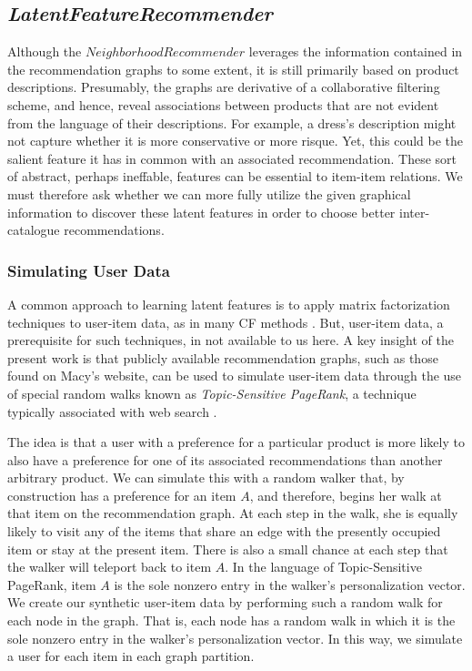 \documentclass[11pt]{article}
\begin{document}
\subsection*{\em LatentFeatureRecommender}
Although the $NeighborhoodRecommender$ leverages the information contained in
the recommendation graphs to some extent, it is still primarily based on product
descriptions. Presumably, the graphs are derivative of a collaborative filtering
scheme, and hence, reveal associations between products that are not evident
from the language of their descriptions. For example, a dress's description
might not capture whether it is more conservative or more risque. Yet, this
could be the salient feature it has in common with an associated recommendation.
These sort of abstract, perhaps ineffable, features can be essential to
item-item relations. We must therefore ask whether we can more fully utilize the
given graphical information to discover these latent features in order to choose
better inter-catalogue recommendations.

\subsubsection*{Simulating User Data}
A common approach to learning latent features is to apply matrix factorization
techniques to user-item data, as in many CF methods \cite{Koren2009}. But,
user-item data, a prerequisite for such techniques, in not available to us here.
A key insight of the present work is that publicly available recommendation
graphs, such as those found on Macy's website, can be used to simulate user-item
data through the use of special random walks known as {\em Topic-Sensitive
PageRank}, a technique typically associated with web search
\cite{Haveliwala2002}.

The idea is that a user with a preference for a particular product is more
likely to also have a preference for one of its associated recommendations than
another arbitrary product. We can simulate this with a random walker that, by
construction has a preference for an item $A$, and therefore, begins her walk at
that item on the recommendation graph. At each step in the walk, she is equally
likely to visit any of the items that share an edge with the presently occupied
item or stay at the present item.  There is also a small chance at each step
that the walker will teleport back to item $A$. In the language of
Topic-Sensitive PageRank, item $A$ is the sole nonzero entry in the walker's
personalization vector. We create our synthetic user-item data by performing
such a random walk for each node in the graph. That is, each node has a random
walk in which it is the sole nonzero entry in the walker's personalization
vector. In this way, we simulate a user for each item in each graph partition.
\end{document}

